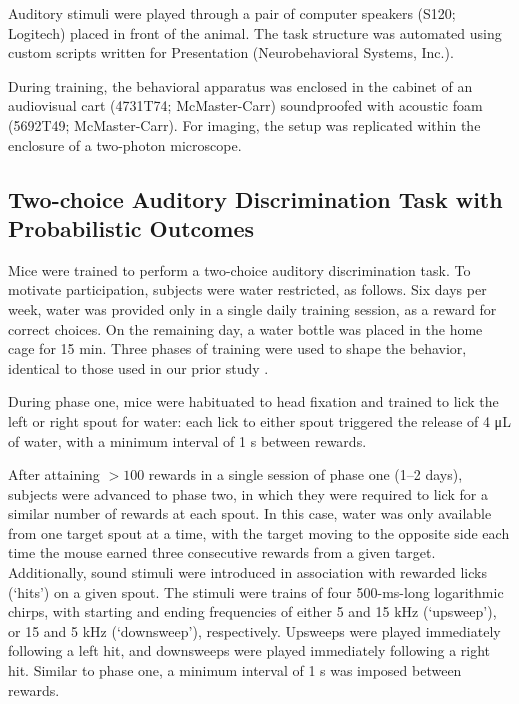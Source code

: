 Auditory stimuli were played through a pair of computer speakers (S120; Logitech) placed in front of the animal. The task structure was automated using custom scripts written for Presentation (Neurobehavioral Systems, Inc.). 

During training, the behavioral apparatus was enclosed in the cabinet of an audiovisual cart (4731T74; McMaster-Carr) soundproofed with acoustic foam (5692T49; McMaster-Carr). For imaging, the setup was replicated within the enclosure of a two-photon microscope.

\subsection*{Two-choice Auditory Discrimination Task with Probabilistic Outcomes}
Mice were trained to perform a two-choice auditory discrimination task. To motivate participation, subjects were water restricted, as follows. Six days per week, water was provided only in a single daily training session, as a reward for correct choices. On the remaining day, a water bottle was placed in the home cage for 15 min. Three phases of training were used to shape the behavior, identical to those used in our prior study \citep{siniscalchi2016fast}. 

During phase one, mice were habituated to head fixation and trained to lick the left or right spout for water: each lick to either spout triggered the release of 4 \si{\uL} of water, with a minimum interval of 1 s between rewards. 

After attaining $>100$ rewards in a single session of phase one (1–2 days), subjects were advanced to phase two, in which they were required to lick for a similar number of rewards at each spout. In this case, water was only available from one target spout at a time, with the target moving to the opposite side each time the mouse earned three consecutive rewards from a given target. Additionally, sound stimuli were introduced in association with rewarded licks (‘hits’) on a given spout. The stimuli were trains of four 500-ms-long logarithmic chirps, with starting and ending frequencies of either 5 and 15 kHz (‘upsweep’), or 15 and 5 kHz (‘downsweep’), respectively. Upsweeps were played immediately following a left hit, and downsweeps were played immediately following a right hit. Similar to phase one, a minimum interval of 1 s was imposed between rewards. 

